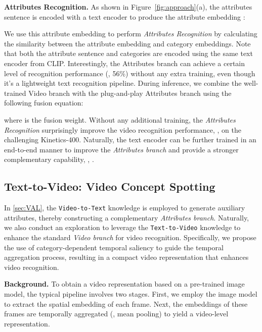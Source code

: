 \documentclass[10pt,twocolumn,letterpaper]{article}
\begin{document}
\noindent\textbf{Attributes Recognition.} 
As shown in Figure~\ref{fig:approach}(a), the attributes sentence  is encoded with a text encoder  to produce the attribute embedding :

We use this attribute embedding to perform \emph{Attributes Recognition} by calculating the similarity  between the attribute embedding and category embeddings.
Note that both the attribute sentence and categories are encoded using the same text encoder from CLIP.
Interestingly, the Attributes branch can achieve a certain level of recognition performance (\eg, 56\%) without any extra training, even though it's a lightweight text recognition pipeline.
During inference, we combine the well-trained Video branch with the plug-and-play Attributes branch using the following fusion equation:

where  is the fusion weight.
Without any additional training, the \emph{Attributes Recognition} surprisingly improve the video recognition performance, \eg,  on the challenging Kinetics-400.
Naturally, the text encoder  can be further trained in an end-to-end manner to improve the \emph{Attributes branch} and provide a stronger complementary capability, \eg, .




\subsection{Text-to-Video: Video Concept Spotting}
\label{sec:sal}
In \cref{sec:VAL}, the \texttt{Video-to-Text} knowledge is employed to generate auxiliary attributes, thereby constructing a complementary \emph{Attributes branch}. 
Naturally, we also conduct an exploration to leverage the \texttt{Text-to-Video} knowledge to enhance the standard \emph{Video branch} for video recognition.
Specifically, we propose the use of category-dependent temporal saliency to guide the temporal aggregation process, resulting in a compact video representation that enhances video recognition.

\noindent\textbf{Background.}
To obtain a video representation based on a pre-trained image model, the typical pipeline involves two stages. First, we employ the image model to extract the spatial embedding of each frame. Next, the embeddings of these frames are temporally aggregated (\eg, mean pooling) to yield a video-level representation.
\end{document}
